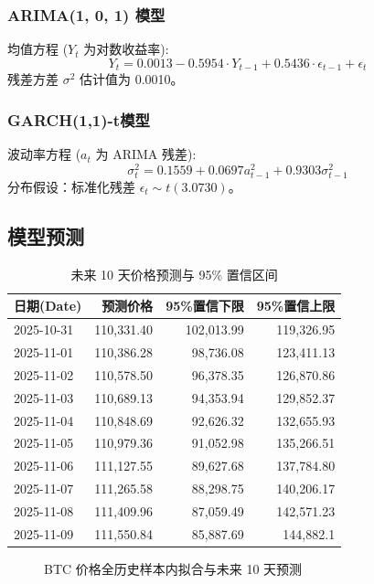\documentclass[a4paper]{ctexart}
\begin{document}
	\subsubsection{ARIMA(1, 0, 1) 模型}
	均值方程 ($Y_t$ 为对数收益率):
	$$ Y_t = 0.0013 - 0.5954 \cdot Y_{t-1} + 0.5436 \cdot \epsilon_{t-1} + \epsilon_t $$
	残差方差 $\sigma^2$ 估计值为 0.0010。
	
	\subsubsection{GARCH(1,1)-t模型}
	波动率方程 ($a_t$ 为 ARIMA 残差):
	$$ \sigma_t^2 = 0.1559 + 0.0697 a_{t-1}^2 + 0.9303 \sigma_{t-1}^2 $$
	分布假设：标准化残差 $\epsilon_t \sim t(3.0730)$。
	
	\subsection{模型预测}
	
	\begin{table}[htbp]
		\centering
		\caption{未来 10 天价格预测与 95\% 置信区间}
		\label{tab:price_forecast}
		\begin{tabular}{lrrr}
			\toprule
			日期(Date) & 预测价格 & 95\%置信下限 & 95\%置信上限 \\
			\midrule
			2025-10-31 & 110,331.40 & 102,013.99 & 119,326.95 \\
			2025-11-01 & 110,386.28 & 98,736.08 & 123,411.13 \\
			2025-11-02 & 110,578.50 & 96,378.35 & 126,870.86 \\
			2025-11-03 & 110,689.13 & 94,353.94 & 129,852.37 \\
			2025-11-04 & 110,848.69 & 92,626.32 & 132,655.93 \\
			2025-11-05 & 110,979.36 & 91,052.98 & 135,266.51 \\
			2025-11-06 & 111,127.55 & 89,627.68 & 137,784.80 \\
			2025-11-07 & 111,265.58 & 88,298.75 & 140,206.17 \\
			2025-11-08 & 111,409.96 & 87,059.49 & 142,571.23 \\
			2025-11-09 & 111,550.84 & 85,887.69 & 144,882.1 \\
			\bottomrule
		\end{tabular}
	\end{table}
	
	\begin{figure}[htbp]
		\centering
		\caption{BTC 价格全历史样本内拟合与未来 10 天预测}
		\label{fig:forecast_full}
	\end{figure}
	
\end{document}
